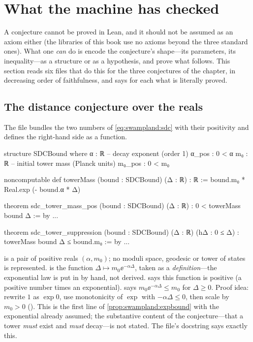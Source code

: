 \section{What the machine has checked}\label{sec:swampland:lean}

A conjecture cannot be proved in Lean, and it should not be assumed as an axiom either (the
libraries of this book use no axioms beyond the three standard ones). What one \emph{can} do is
encode the conjecture's shape---its parameters, its inequality---as a structure or as a hypothesis,
and prove what follows. This section reads six files that do this for the three conjectures of
the chapter, in decreasing order of faithfulness, and says for each what is literally proved.

\subsection{The distance conjecture over the reals}

The file  bundles the two numbers
of \eqref{eq:swampland:sdc} with their positivity and defines the right-hand side as a function.

\begin{leancode}
structure SDCBound where
  α : ℝ          -- decay exponent (order 1)
  α_pos : 0 < α
  m₀ : ℝ         -- initial tower mass (Planck units)
  m₀_pos : 0 < m₀

noncomputable def towerMass (bound : SDCBound) (Δ : ℝ) : ℝ :=
  bound.m₀ * Real.exp (- bound.α * Δ)

theorem sdc_tower_mass_pos (bound : SDCBound) (Δ : ℝ) :
    0 < towerMass bound Δ := by ...

theorem sdc_tower_suppression (bound : SDCBound) (Δ : ℝ) (hΔ : 0 ≤ Δ) :
    towerMass bound Δ ≤ bound.m₀ := by ...
\end{leancode}

\begin{leanbox}
 is a pair of positive reals $(\alpha,m_0)$; no moduli space, geodesic or tower of
states is represented.  is the function $\Delta\mapsto m_0\ee^{-\alpha\Delta}$, taken
as a \emph{definition}---the exponential law is put in by hand, not derived.
 says this function is positive (a positive number times an
exponential).  says $m_0\ee^{-\alpha\Delta}\le m_0$ for $\Delta\ge0$.
Proof idea: rewrite $1$ as $\exp0$, use monotonicity of $\exp$ with $-\alpha\Delta\le0$, then scale by
$m_0>0$ (). This is the first line of \cref{prop:swampland:expbound} with the
exponential already assumed; the substantive content of the conjecture---that a tower
\emph{must} exist and \emph{must} decay---is not stated. The file's docstring says exactly this.
\end{leanbox}


